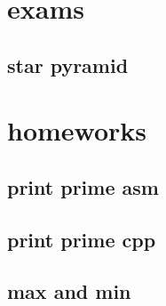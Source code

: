 \section{exams}
    \subsection{star pyramid}
            

\section{homeworks}
    \subsection{print prime asm}
                
    \subsection{print prime cpp}
                  
    \subsection{max and min}
            
    
    